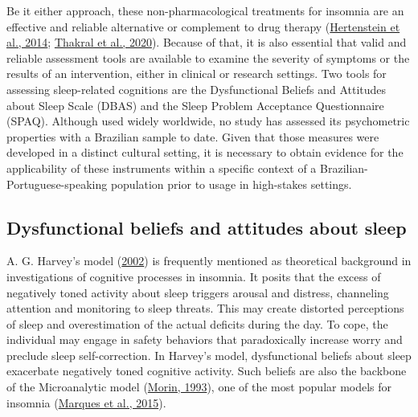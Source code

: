 \documentclass[
  ,doc,11pt, twoside,floatsintext]{apa6}
\begin{document}
Be it either approach, these non-pharmacological treatments for insomnia are an effective and reliable alternative or complement to drug therapy (\protect\hyperlink{ref-hertenstein2014}{Hertenstein et al., 2014}; \protect\hyperlink{ref-thakral2020}{Thakral et al., 2020}). Because of that, it is also essential that valid and reliable assessment tools are available to examine the severity of symptoms or the results of an intervention, either in clinical or research settings. Two tools for assessing sleep-related cognitions are the Dysfunctional Beliefs and Attitudes about Sleep Scale (DBAS) and the Sleep Problem Acceptance Questionnaire (SPAQ). Although used widely worldwide, no study has assessed its psychometric properties with a Brazilian sample to date. Given that those measures were developed in a distinct cultural setting, it is necessary to obtain evidence for the applicability of these instruments within a specific context of a Brazilian-Portuguese-speaking population prior to usage in high-stakes settings.

\hypertarget{dysfunctional-beliefs-and-attitudes-about-sleep}{%
\subsection{Dysfunctional beliefs and attitudes about sleep}\label{dysfunctional-beliefs-and-attitudes-about-sleep}}

A. G. Harvey's model (\protect\hyperlink{ref-harvey2002}{2002}) is frequently mentioned as theoretical background in investigations of cognitive processes in insomnia. It posits that the excess of negatively toned activity about sleep triggers arousal and distress, channeling attention and monitoring to sleep threats. This may create distorted perceptions of sleep and overestimation of the actual deficits during the day. To cope, the individual may engage in safety behaviors that paradoxically increase worry and preclude sleep self-correction. In Harvey's model, dysfunctional beliefs about sleep exacerbate negatively toned cognitive activity. Such beliefs are also the backbone of the Microanalytic model (\protect\hyperlink{ref-morin1993insomnia}{Morin, 1993}), one of the most popular models for insomnia (\protect\hyperlink{ref-marques2015}{Marques et al., 2015}).
\end{document}
